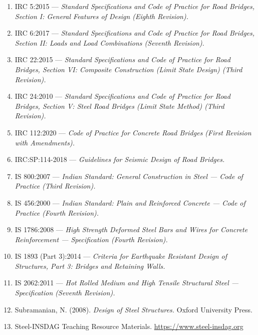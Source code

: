 \documentclass[12pt,a4paper]{report}
\numberwithin{table}{chapter}
\numberwithin{figure}{chapter}
\begin{document}
\begin{enumerate}

\item IRC 5:2015 --- \textit{Standard Specifications and Code of Practice for Road Bridges, Section I: General Features of Design (Eighth Revision).}

\item IRC 6:2017 --- \textit{Standard Specifications and Code of Practice for Road Bridges, Section II: Loads and Load Combinations (Seventh Revision).}

\item IRC 22:2015 --- \textit{Standard Specifications and Code of Practice for Road Bridges, Section VI: Composite Construction (Limit State Design) (Third Revision).}

\item IRC 24:2010 --- \textit{Standard Specifications and Code of Practice for Road Bridges, Section V: Steel Road Bridges (Limit State Method) (Third Revision).}

\item IRC 112:2020 --- \textit{Code of Practice for Concrete Road Bridges (First Revision with Amendments).}

\item IRC:SP:114-2018 --- \textit{Guidelines for Seismic Design of Road Bridges.}

\item IS 800:2007 --- \textit{Indian Standard: General Construction in Steel --- Code of Practice (Third Revision).}

\item IS 456:2000 --- \textit{Indian Standard: Plain and Reinforced Concrete --- Code of Practice (Fourth Revision).}

\item IS 1786:2008 --- \textit{High Strength Deformed Steel Bars and Wires for Concrete Reinforcement --- Specification (Fourth Revision).}

\item IS 1893 (Part 3):2014 --- \textit{Criteria for Earthquake Resistant Design of Structures, Part 3: Bridges and Retaining Walls.}

\item IS 2062:2011 --- \textit{Hot Rolled Medium and High Tensile Structural Steel --- Specification (Seventh Revision).}

\item Subramanian, N. (2008). \textit{Design of Steel Structures.} Oxford University Press.

\item Steel-INSDAG Teaching Resource Materials. \url{https://www.steel-insdag.org}

\end{enumerate}
\end{document}
